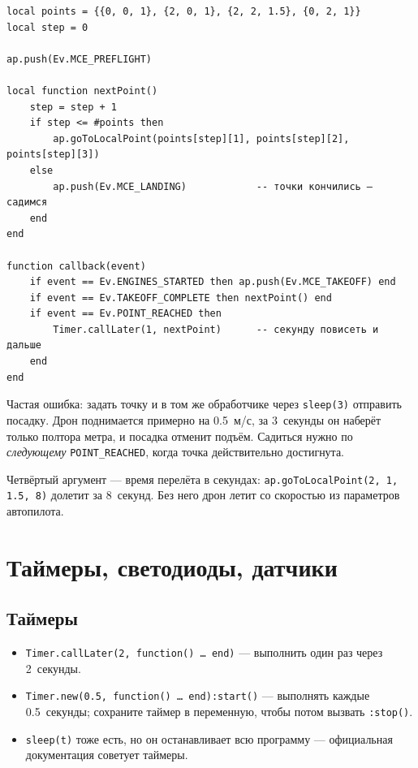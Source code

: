 \documentclass[11pt,a4paper]{article}
\begin{document}
\begin{lstlisting}[style=lua]
local points = {{0, 0, 1}, {2, 0, 1}, {2, 2, 1.5}, {0, 2, 1}}
local step = 0

ap.push(Ev.MCE_PREFLIGHT)

local function nextPoint()
    step = step + 1
    if step <= #points then
        ap.goToLocalPoint(points[step][1], points[step][2], points[step][3])
    else
        ap.push(Ev.MCE_LANDING)            -- точки кончились — садимся
    end
end

function callback(event)
    if event == Ev.ENGINES_STARTED then ap.push(Ev.MCE_TAKEOFF) end
    if event == Ev.TAKEOFF_COMPLETE then nextPoint() end
    if event == Ev.POINT_REACHED then
        Timer.callLater(1, nextPoint)      -- секунду повисеть и дальше
    end
end
\end{lstlisting}

\begin{warn}
Частая ошибка: задать точку и в том же обработчике через \texttt{sleep(3)} отправить посадку. Дрон
поднимается примерно на 0.5~м/с, за 3~секунды он наберёт только полтора метра, и посадка отменит
подъём. Садиться нужно по \emph{следующему} \texttt{POINT\_REACHED}, когда точка действительно достигнута.
\end{warn}

\begin{tip}
Четвёртый аргумент — время перелёта в секундах: \texttt{ap.goToLocalPoint(2, 1, 1.5, 8)} долетит за 8~секунд.
Без него дрон летит со скоростью из параметров автопилота.
\end{tip}

\section{Таймеры, светодиоды, датчики}

\subsection{Таймеры}
\begin{itemize}[itemsep=1pt]
    \item \texttt{Timer.callLater(2, function() \dots\ end)} — выполнить один раз через 2~секунды.
    \item \texttt{Timer.new(0.5, function() \dots\ end):start()} — выполнять каждые 0.5~секунды;
          сохраните таймер в переменную, чтобы потом вызвать \texttt{:stop()}.
    \item \texttt{sleep(t)} тоже есть, но он останавливает всю программу — официальная документация
          советует таймеры.
\end{itemize}
\end{document}
